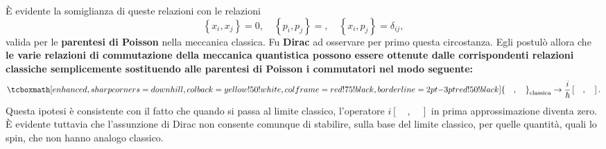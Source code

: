 È evidente la somiglianza di queste relazioni con le relazioni
	\begin{equation}
		\left\{ x_i, x_j\right\}=0,\quad \left\{ p_i, p_j\right\}=, \quad \left\{ x_i, p_j\right\}=\delta _{ij}, 
\end{equation}
valida per le \textbf{parentesi di Poisson} nella meccanica classica. Fu \textbf{Dirac} ad osservare per primo questa circostanza. Egli postulò allora che \textbf{le varie relazioni di commutazione della meccanica quantistica possono essere ottenute dalle corrispondenti relazioni classiche semplicemente sostituendo alle parentesi di Poisson i commutatori nel modo seguente:}
	\begin{equation}
		\tcboxmath[enhanced,sharp corners=downhill ,colback=yellow!50!white,colframe=red!75!black, borderline={2pt}{-3pt}{red!50!black}]{
			\left\{ \quad, \quad \right\} _{\textrm{classica}} \rightarrow \frac{i}{\hbar}\left[ \quad, \quad \right] .
			}
	\end{equation}
Questa ipotesi è consistente con il fatto che quando si passa al limite classico, l'operatore $i\left[ \quad, \quad \right]$ in prima approssimazione diventa zero.\\

È evidente tuttavia che l'assunzione di Dirac non consente comunque di stabilire, sulla base del limite classico, per quelle quantità, quali lo spin, che non hanno analogo classico.
